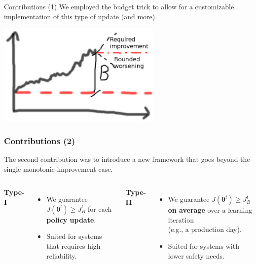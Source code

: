 \documentclass{beamer}
\makeatletter
\newcommand{\vtheta}{{\boldsymbol{\theta}}}
\DeclareRobustCommand{\eg}{e.g.,\@\xspace}
\newcommand{\jbase}[1][t]{{J_{B}^{#1}}}
\makeatother
\begin{document}
\begin{frame}{Contributions (1)}
We employed the budget trick to allow for a customizable implementation of this type of update (and more).
\vfill

\centering
\includegraphics[width=0.6\textwidth]{pictures/budget_image}
\end{frame}




\begin{frame}
\frametitle{Contributions (2)}
The second contribution was to introduce a new framework that goes beyond the single monotonic improvement case.
\vspace{0.3cm}
\begin{columns}[T]
\centering
\textbf{Type-I}
\vspace{0.3cm}
\begin{itemize}
\item We guarantee $J(\vtheta^t) \geq \jbase$ for each \textbf{policy update}.
\item Suited for systems that requires high reliability.
\end{itemize}
\centering
\textbf{Type-II}
\vspace{0.3cm}
\begin{itemize}
\item We guarantee $J(\vtheta^t)\geq \jbase$  \textbf{on average} over a learning iteration \\ (\eg a production day).
\item Suited for systems with lower safety needs.
\end{itemize}
\end{columns}

\end{frame}
\end{document}
